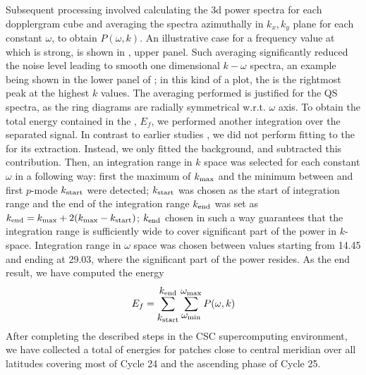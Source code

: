 \documentclass{aa}
\begin{document}
Subsequent processing involved calculating the 3d power spectra for each dopplergram cube and averaging the spectra azimuthally in $k_x, k_y$ plane for each constant $\omega$,
to obtain $P(\omega,k)$. An illustrative case for a frequency
value at which \fff is strong, is shown in 
,
upper panel.
Such averaging significantly reduced the noise level leading to smooth one dimensional $k-\omega$ spectra,
an example being shown in the lower panel of ;
in this kind of a plot, the \fff is the rightmost peak at the highest $k$ values.
The
averaging 
performed
is justified for the 
QS
spectra, as the ring diagrams are radially symmetrical w.r.t. $\omega$ axis. 
To obtain the total energy contained in the \fff, $E_f$, we
performed another integration over the separated \fff signal.
In contrast to earlier studies \citep{SRB16,Waidele22}, we
did not perform fitting to the \fff for its extraction. 
Instead, we only fitted the background, and subtracted this 
contribution.
Then,
an integration range in $k$ space was selected for each constant $\omega$ in a following way: first the maximum of \fff $k_{\rm max}$ and the minimum between \fff and first $p$-mode $k_{\rm start}$ were detected; $k_{\rm start}$ was chosen as the start of integration range and the end of the integration range $k_{\rm end}$ was set as $k_{\rm end}=k_{\rm max}+2(k_{\rm max}-k_{\rm start})$; $k_{\rm end}$ chosen in such a way guarantees that the integration range is sufficiently wide to cover significant part of the \fff power in $k$-space.
Integration range in $\omega$ space was chosen between values starting from 
14.45 and ending at 29.03, 
where the significant part of the \fff power resides. 
As the end result, we have computed the \fff energy
\begin{equation}
E_f=
\sum_{\mbox{$k_{\rm start}$}}^{\mbox{$k_{\rm end}$}}
\sum_{\mbox{$\omega_{\rm min}$}}^{\mbox{$\omega_{\rm max}$}} P(\omega,k)
\end{equation}
After completing the described steps in the CSC supercomputing
environment, we have collected a total of  \fff 
energies
for patches close to central meridian over all latitudes covering 
most of Cycle 24 and the ascending phase of Cycle 25.
\end{document}
